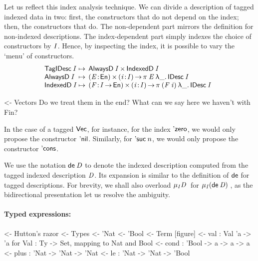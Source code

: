 Let us reflect this index analysis technique.
We can divide a description of tagged indexed data in two: first, the
constructors that do not depend on the index; then, the constructors
that do. The non-dependent part mirrors the definition for non-indexed
descriptions. The index-dependent part simply indexes the choice of
constructors by $\V{I}$. Hence, by inspecting the index, it is
possible to vary the `menu' of constructors.
%
\[
\begin{array}{@{}l@{\:\mapsto\:\:}l}
 \TagIDesc{\V{I}}  & \TIMES{\ATagIDesc{\V{I}}}{\ITagIDesc{\V{I}}} \\
 \ATagIDesc{\V{I}} & \SIGMA{\V{E}}{\EnumU} \PI{\V{i}}{\V{I}} \spi{\V{E}}{\LAM{\_} \IDesc{\V{I}}} \\
 \ITagIDesc{\V{I}} & 
     \SIGMA{\V{F}}{\V{I} \To \EnumU} \PI{\V{i}}{\V{I}} \spi{(\V{F}\: \V{i})}{\LAM{\_} \IDesc{\V{I}}} 
\end{array}
\]

\begin{wstructure}
<- Vectors
    Do we treat them in the end? 
    What can we say here we haven't with Fin?
\end{wstructure}

In the case of a tagged $\D{Vec}$, for instance, for the index
$\NatZero$, we would only propose the constructor
$\ListNil$. Similarly, for $\NatSuc{n}$, we would only propose the
constructor $\SYMBListCons$.

We use the notation $\toIDesc{\V{D}}$ to denote the indexed
description computed from the tagged indexed description $\V{D}$. Its
expansion is similar to the definition of \(\SYMBtoDesc\) for tagged
descriptions. For brevity, we shall also overload $\IMu{\V{I}}{\V{D}}$ for
$\IMu{\V{I}}{(\toIDesc{\V{D}})}$, as the bidirectional presentation let us
resolve the ambiguity.
 
\paragraph{Typed expressions:}

\begin{wstructure}
<- Hutton's razor
    <- Types
        <- 'Nat
        <- 'Bool
    <- Term [figure]
        <- val : Val 'a -> 'a  for Val : Ty -> Set, mapping to Nat and Bool
        <- cond : 'Bool -> a -> a -> a
        <- plus : 'Nat -> 'Nat -> 'Nat
        <- le : 'Nat -> 'Nat -> 'Bool
\end{wstructure}

\newcommand{\Ty}{\D{Ty}}
\newcommand{\Ebool}{\etag{\CN{bool}}}
\newcommand{\Enat}{\etag{\CN{nat}}}

